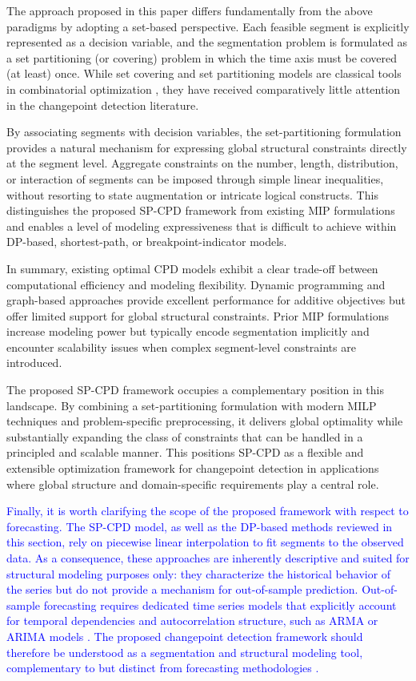 \documentclass[preprints,article,submit,pdftex,moreauthors]{Definitions/mdpi}
\newcommand{\highlight}[1]{\textcolor{blue}{#1}}
\begin{document}
The approach proposed in this paper differs fundamentally from the above paradigms by adopting a set-based perspective. Each feasible segment is explicitly represented as a decision variable, and the segmentation problem is formulated as a set partitioning (or covering) problem in which the time axis must be covered (at least) once. While set covering and set partitioning models are classical tools in combinatorial optimization \cite{B69,S03}, they have received comparatively little attention in the changepoint detection literature.

By associating segments with decision variables, the set-partitioning formulation provides a natural mechanism for expressing global structural constraints directly at the segment level. Aggregate constraints on the number, length, distribution, or interaction of segments can be imposed through simple linear inequalities, without resorting to state augmentation or intricate logical constructs. This distinguishes the proposed SP-CPD framework from existing MIP formulations and enables a level of modeling expressiveness that is difficult to achieve within DP-based, shortest-path, or breakpoint-indicator models.

In summary, existing optimal CPD models exhibit a clear trade-off between computational efficiency and modeling flexibility. Dynamic programming and graph-based approaches provide excellent performance for additive objectives but offer limited support for global structural constraints. Prior MIP formulations increase modeling power but typically encode segmentation implicitly and encounter scalability issues when complex segment-level constraints are introduced.

The proposed SP-CPD framework occupies a complementary position in this landscape. By combining a set-partitioning formulation with modern MILP techniques and problem-specific preprocessing, it delivers global optimality while substantially expanding the class of constraints that can be handled in a principled and scalable manner. This positions SP-CPD as a flexible and extensible optimization framework for changepoint detection in applications where global structure and domain-specific requirements play a central role.

\highlight{Finally, it is worth clarifying the scope of the proposed framework with respect to forecasting. The SP-CPD model, as well as the DP-based methods reviewed in this section, rely on piecewise linear interpolation to fit segments to the observed data. As a consequence, these approaches are inherently descriptive and suited for structural modeling purposes only: they characterize the historical behavior of the series but do not provide a mechanism for out-of-sample prediction. Out-of-sample forecasting requires dedicated time series models that  explicitly account for temporal dependencies and autocorrelation structure, such as ARMA or ARIMA models \cite{box2015,hyndman2018}. The proposed changepoint detection framework should therefore be understood as a segmentation and structural modeling tool, complementary to but distinct from forecasting methodologies \cite{lopez2021}.}
\end{document}
